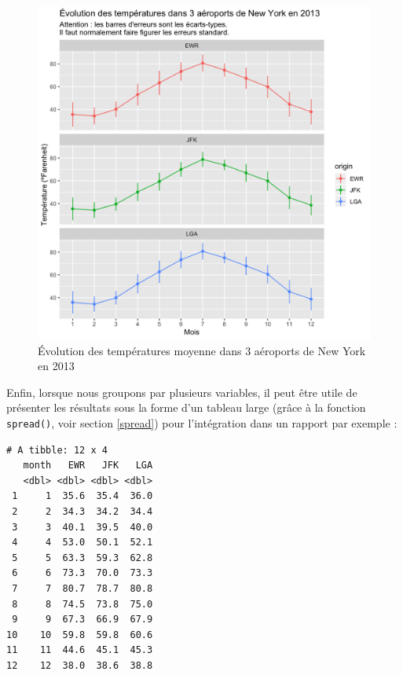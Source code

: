 \documentclass[a4paperpaper,]{article}
\newenvironment{Shaded}{\begin{snugshade}}{\end{snugshade}}
\newcommand{\DataTypeTok}[1]{\textcolor[rgb]{0.00,0.34,0.68}{#1}}
\newcommand{\KeywordTok}[1]{\textcolor[rgb]{0.12,0.11,0.11}{\textbf{#1}}}
\newcommand{\NormalTok}[1]{\textcolor[rgb]{0.12,0.11,0.11}{#1}}
\newcommand{\OperatorTok}[1]{\textcolor[rgb]{0.12,0.11,0.11}{#1}}
\newcommand{\OtherTok}[1]{\textcolor[rgb]{0.00,0.43,0.16}{#1}}
\newcommand{\StringTok}[1]{\textcolor[rgb]{0.75,0.01,0.01}{#1}}
\begin{document}
\begin{figure}[htpb]

{\centering \includegraphics[width=0.9\linewidth]{figure/errorbars4-1} 

}

\caption{Évolution des températures moyenne dans 3 aéroports de New York en 2013}\label{fig:errorbars4}
\end{figure}

Enfin, lorsque nous groupons par plusieurs variables, il peut être utile de présenter les résultats sous la forme d'un tableau large (grâce à la fonction \texttt{spread()}, voir section \ref{spread}) pour l'intégration dans un rapport par exemple :

\begin{Shaded}
\end{Shaded}

\begin{verbatim}
# A tibble: 12 x 4
   month   EWR   JFK   LGA
   <dbl> <dbl> <dbl> <dbl>
 1     1  35.6  35.4  36.0
 2     2  34.3  34.2  34.4
 3     3  40.1  39.5  40.0
 4     4  53.0  50.1  52.1
 5     5  63.3  59.3  62.8
 6     6  73.3  70.0  73.3
 7     7  80.7  78.7  80.8
 8     8  74.5  73.8  75.0
 9     9  67.3  66.9  67.9
10    10  59.8  59.8  60.6
11    11  44.6  45.1  45.3
12    12  38.0  38.6  38.8
\end{verbatim}
\end{document}
